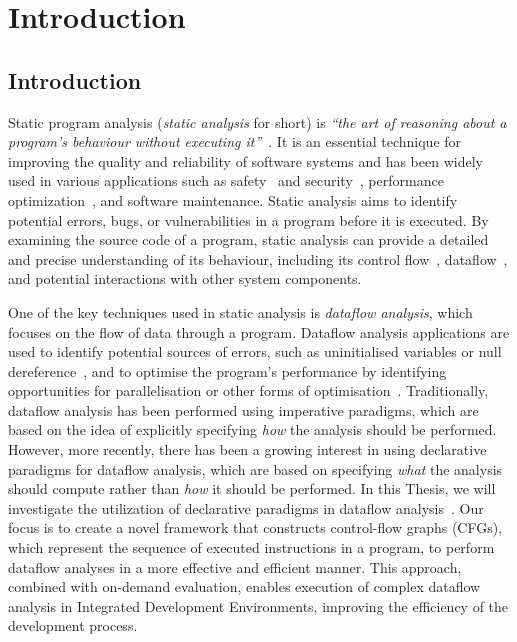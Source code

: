\chapter{Introduction}
\section{Introduction}

Static program analysis (\emph{static analysis} for short) is
\emph{``the art of reasoning about a program's behaviour without executing it''}~\cite{spa}.
It is an essential technique for improving the quality and reliability of software
systems and has been widely used in various applications such
as safety~\cite{cousot2005astree,Blanchet2002} and security~\cite{piskachev2021secucheck,flowDroid,ayewah2008using,dura2021javadl,fink2012wala},
performance optimization~\cite{aho2007compilers,appel2004modern}, and software maintenance.
Static analysis aims to identify potential errors, bugs, or vulnerabilities
in a program before it is executed.
By examining the source code of a program, static
analysis can provide a detailed and precise understanding of its behaviour, including
its control flow~\cite{allen1970control}, dataflow~\cite{kam1977monotone},
and potential interactions with other system components.



One of the key techniques used in static analysis is \emph{dataflow analysis},
which focuses on the flow of data through a program. Dataflow analysis applications are used to identify
potential sources of errors, such as uninitialised variables or null dereference~\cite{riouak2021precise,10.1016/j.scico.2012.02.002},
and to optimise the program's performance by identifying opportunities for
parallelisation or other forms of optimisation~\cite{aho2007compilers}.
Traditionally, dataflow analysis has been performed using imperative paradigms,
which are based on the idea of explicitly specifying \emph{how} the analysis should be
performed.
However, more recently, there has been a growing interest in using
declarative paradigms for dataflow analysis, which are based on specifying \emph{what}
the analysis should compute rather than \emph{how} it should be performed.
In this Thesis, we will investigate the utilization of declarative paradigms in
dataflow analysis~\cite{smits2020flowspec,madsen2016programming}. Our focus is to
create a novel framework that constructs control-flow graphs (CFGs), which represent the
sequence of executed instructions in a program, to perform dataflow analyses in a
more effective and efficient manner. This approach, combined with on-demand evaluation,
enables execution of complex dataflow analysis in Integrated Development Environments,
improving the efficiency of the development process.

